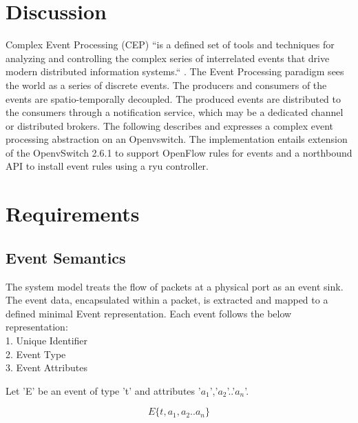 \chapter{Discussion} \label{chap:Discussion}
Complex Event Processing (CEP) ``is a defined set of tools and techniques for analyzing and controlling the complex series of interrelated events that drive modern distributed information systems.`` \citep{Luckham2008}. The Event Processing paradigm sees the world as a series of discrete events. The producers and consumers of the events are spatio-temporally decoupled. The produced events are distributed to the consumers through a notification service, which may be a dedicated channel or distributed brokers. The following describes and expresses a complex event processing abstraction on an Openvswitch. The implementation entails extension of the OpenvSwitch 2.6.1 to support OpenFlow rules for events and a northbound API to install event rules using a ryu controller.



\chapter{Requirements}

\section{\textbf{Event Semantics}}
The system model treats the flow of packets at a physical port as an event sink. The event data, encapsulated within a packet, is extracted and mapped to a defined minimal Event representation. Each event follows the below representation:\\1. Unique Identifier\\
2. Event Type\\3. Event Attributes 

Let 'E' be an event of type 't' and attributes '$a_1$','$a_2$'..'$a_n$'.

\begin{equation}
E\lbrace t,a_1,a_2..a_n \rbrace
\end{equation}

